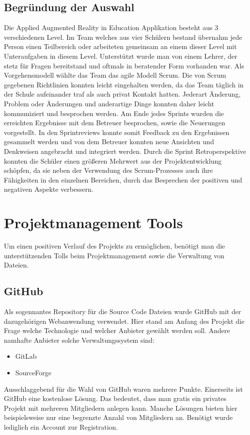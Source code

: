 \subsection{Begründung der Auswahl}
Die Applied Augmented Reality in Education Applikation besteht aus 3 verschiedenen Level.
Im Team welches aus vier Schülern bestand übernahm jede Person einen Teilbereich oder arbeiteten
gemeinsam an einem dieser Level mit Unteraufgaben in diesem Level. Unterstützt wurde man von einem
Lehrer, der stetz für Fragen bereitstand und oftmals in beratender Form vorhanden war. Als
Vorgehensmodell wählte das Team das agile Modell Scrum. Die von Scrum gegebenen Richtlinien
konnten leicht eingehalten werden, da das Team täglich in der Schule aufeinander
traf als auch privat Kontakt hatten. Jederart Änderung, Problem oder Änderungen und anderartige
Dinge konnten daher leicht kommuniziert und besprochen werden. Am Ende jedes Sprints wurden
die erreichten Ergebnisse mit dem Betreuer besprochen, sowie die Neuerungen vorgestellt.
In den Sprintreviews konnte somit Feedback zu den Ergebnissen gesammelt werden und von dem
Betreuer konnten neue Ansichten und Denkweisen angebracht und integriert werden.
Durch die Sprint Retroperspektive konnten die Schüler einen größeren Mehrwert aus der
Projektentwicklung schöpfen, da sie neben der Verwendung des Scrum-Prozesses auch ihre Fähigkeiten
in den einzelnen Bereichen, durch das Besprechen der positiven und negativen Aspekte verbessern.

\section{Projektmanagement Tools}
Um einen positiven Verlauf des Projekts zu ermöglichen, benötigt man die unterstützenden
Tolls beim Projektmanagement sowie die Verwaltung von Dateien.

\subsection{GitHub}
Als sogennantes Repository für die Source Code Dateien wurde GitHub mit der dazugehörigen
Webanwendung verwendet. Hier stand am Anfang des Projekt die Frage welche Technologie und
welcher Anbieter gewählt werden soll. Andere namhafte Anbieter solche Verwaltungssystem sind:
\begin{itemize}
    \item GitLab
    \item SourceForge
\end{itemize}
Ausschlaggebend für die Wahl von GitHub waren mehrere Punkte. Einerseits ist GitHub eine
kostenlose Lösung. Das bedeutet, dass man gratis ein privates Projekt mit mehreren Mitgliedern
anlegen kann. Manche Lösungen bieten hier beispielsweise nur eine begrenzte Anzahl von
Mitgliedern an. Benötigt wurde lediglich ein Account zur Registration.


